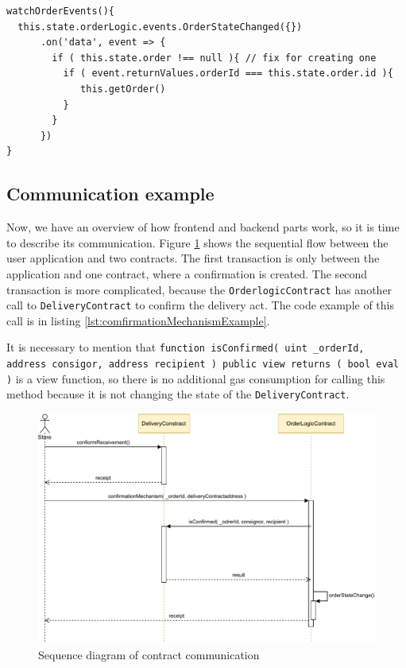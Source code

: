 \documentclass[thesis=M,english]{FITthesis}[2019/12/23]
\begin{document}
\begin{lstlisting}[caption=App.js receiving OrderStateChanged events]
watchOrderEvents(){
  this.state.orderLogic.events.OrderStateChanged({})
      .on('data', event => {
        if ( this.state.order !== null ){ // fix for creating one
          if ( event.returnValues.orderId === this.state.order.id ){
             this.getOrder()
          }
        }
      })
}
\end{lstlisting}


\subsection{Communication example}

Now, we have an overview of how frontend and backend parts work, so it is time to describe its communication. Figure \ref{fig:sekvencialFlow} shows the sequential flow between the user application and two contracts. The first transaction is only between the application and one contract, where a confirmation is created. The second transaction is more complicated, because the \texttt{OrderlogicContract} has another call to \texttt{DeliveryContract} to confirm the delivery act.  The code example of this call is in listing \ref{lst:comfirmationMechanismExample}.

It is necessary to mention that \texttt{function isConfirmed( uint \_orderId, address consigor, address recipient ) public view returns ( bool eval )}  is a view function, so there is no additional gas consumption for calling this method because it is not changing the state of the \texttt{DeliveryContract}. 

\begin{figure}[ht!]
    \centering
    \includegraphics[width=\textwidth]{assets/SequenceDiagram.pdf}
    \caption{Sequence diagram of contract communication}
    \label{fig:sekvencialFlow}
\end{figure}
\end{document}
